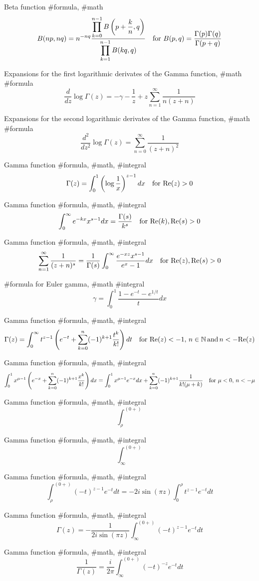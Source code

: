 Beta function #formula, #math
$$
B(np,nq)=n^{-nq}\frac{\displaystyle\prod^{n-1}_{k=0} B\left(p+\frac{k}{n},q\right)}{\displaystyle\prod^{n-1}_{k=1}B(k q, q)} \quad {\rm for}\,\, B(p,q)=\frac{\Gamma(p)\Gamma(q)}{\Gamma(p+q)}
$$

Expansions for the first logarithmic derivates of the Gamma function, #math #formula 
$$
\frac{d}{dz}\log \Gamma(z)=-\gamma-\frac{1}{z}+z\sum^\infty_{n=1}\frac{1}{n(z+n)}
$$

Expansions for the second logarithmic derivates of the Gamma function, #math #formula 
$$
\frac{d^2}{dz^2}\log \Gamma(z)=\sum^\infty_{n=0}\frac{1}{(z+n)^2}
$$

Gamma function #formula, #math, #integral
$$
\Gamma(z)=\int^1_0 \left(\log \frac{1}{x}\right)^{z-1}dx \quad {\rm for}\,\,{\rm Re}(z)>0
$$

Gamma function #formula, #math, #integral
$$
\int^\infty_0 e^{-kx}x^{s-1}dx=\frac{\Gamma(s)}{k^s} \quad {\rm for}\,\,{\rm Re}(k),{\rm Re}(s)>0
$$

Gamma function #formula, #math, #integral
$$
\sum^\infty_{n=1}\frac{1}{(z+n)^s}=\frac{1}{\Gamma(s)}\int^\infty_0 \frac{e^{-xz}x^{s-1}}{e^x-1}dx \quad {\rm for}\,\,{\rm Re}(z),{\rm Re}(s)>0
$$

#formula for Euler gamma, #math #integral
$$
\gamma=\int^1_0 \frac{1-e^{-t}-e^{1/t}}{t}dx 
$$

Gamma function #formula, #math, #integral
$$
\Gamma(z)=\int^\infty_0t^{z-1}\left(e^{-t}+\sum^n_{k=0}(-1)^{k+1}\frac{t^k}{k!}\right)dt \quad {\rm for}\,\, {\rm Re}(z)<-1,\,n\in{\mathbb N}\,{\rm and}\,n<-{\rm Re}(z)
$$

Gamma function #formula, #math, #integral
$$
\int^1_0 x^{\mu-1}\left(e^{-x}+\sum^n_{k=0}(-1)^{k+1}\frac{x^k}{k!}\right)dx = \int^1_0 x^{\mu-1} e^{-x}dx+\sum^n_{k=0} (-1)^{k+1}\frac{1}{k! (\mu+k)} \quad {\rm for}\,\,\mu<0,\,n<-\mu
$$

Gamma function #formula, #math, #integral
$$
\int^{(0+)}_\rho
$$

Gamma function #formula, #math, #integral
$$
\int^{(0+)}_\infty
$$

Gamma function #formula, #math, #integral
$$
\int^{(0+)}_\rho (-t)^{z-1}e^{-t}dt=-2i\sin(\pi z)\int^\rho_0 t^{z-1}e^{-t}dt
$$

Gamma function #formula, #math, #integral
$$
\Gamma(z)=-\frac{1}{2i\sin(\pi z)}\int^{(0+)}_\infty (-t)^{z-1}e^{-t}dt
$$

Gamma function #formula, #math, #integral
$$
\frac{1}{\Gamma(z)}=\frac{i}{2\pi}\int^{(0+)}_\infty (-t)^{-z}e^{-t}dt
$$

